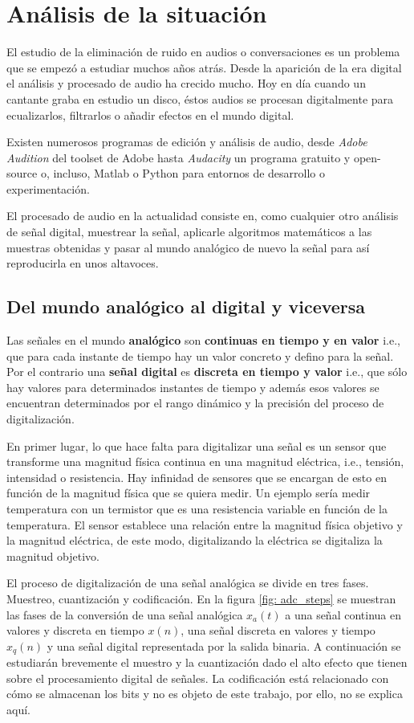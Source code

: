 \chapter{Análisis de la situación}\label{cp: situationalAnalysis}
El estudio de la eliminación de ruido en audios o conversaciones es un problema que se empezó a estudiar muchos años atrás. Desde la aparición de la era digital el análisis y procesado de audio ha crecido mucho. Hoy en día cuando un cantante graba en estudio un disco, éstos audios se procesan digitalmente para ecualizarlos, filtrarlos o añadir efectos en el mundo digital.

Existen numerosos programas de edición y análisis de audio, desde \textit{Adobe Audition} del toolset de Adobe hasta \textit{Audacity} un programa gratuito y open-source o, incluso, Matlab\superscript{\textregistered} o Python para entornos de desarrollo o experimentación.

El procesado de audio en la actualidad consiste en, como cualquier otro análisis de señal digital, muestrear la señal, aplicarle algoritmos matemáticos a las muestras obtenidas y pasar al mundo analógico de nuevo la señal para así reproducirla en unos altavoces.

\section{Del mundo analógico al digital y viceversa}
Las señales en el mundo \textbf{analógico} son \textbf{continuas en tiempo y en valor} i.e., que para cada instante de tiempo hay un valor concreto y defino para la señal. Por el contrario una \textbf{señal digital} es \textbf{discreta en tiempo y valor} i.e., que sólo hay valores para determinados instantes de tiempo y además esos valores se encuentran determinados por el rango dinámico y la precisión del proceso de digitalización.

En primer lugar, lo que hace falta para digitalizar una señal es un sensor que transforme una magnitud física continua en una magnitud eléctrica, i.e., tensión, intensidad o resistencia. Hay infinidad de sensores que se encargan de esto en función de la magnitud física que se quiera medir. Un ejemplo sería medir temperatura con un termistor que es una resistencia variable en función de la temperatura. El sensor establece una relación entre la magnitud física objetivo y la magnitud eléctrica, de este modo, digitalizando la eléctrica se digitaliza la magnitud objetivo.

El proceso de digitalización de una señal analógica se divide en tres fases. Muestreo, cuantización y codificación. En la figura \ref{fig: adc_steps} se muestran las fases de la conversión de una señal analógica $x_a(t)$ a una señal continua en valores y discreta en tiempo $x(n)$, una señal discreta en valores y tiempo $x_q(n)$ y una señal digital representada por la salida binaria. A continuación se estudiarán brevemente el muestro y la cuantización dado el alto efecto que tienen sobre el procesamiento digital de señales. La codificación está relacionado con cómo se almacenan los bits y no es objeto de este trabajo, por ello, no se explica aquí.

